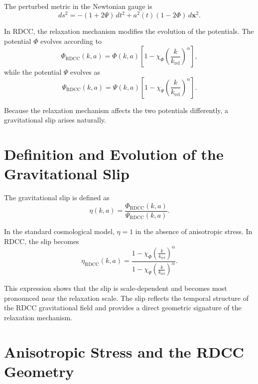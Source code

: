 \documentclass[11pt,a4paper]{article}
\begin{document}
The perturbed metric in the Newtonian gauge is
\begin{equation}
    ds^{2}
    = -(1 + 2\Psi)\,dt^{2}
      + a^{2}(t)(1 - 2\Phi)\,d\mathbf{x}^{2}.
\end{equation}

In RDCC, the relaxation mechanism modifies the evolution of the potentials. The 
potential $\Phi$ evolves according to
\begin{equation}
    \Phi_{\mathrm{RDCC}}(k,a)
    = \Phi(k,a)
      \left[
        1 - \chi_{\Phi}
        \left(\frac{k}{k_{\mathrm{rel}}}\right)^{\alpha}
      \right],
\end{equation}
while the potential $\Psi$ evolves as
\begin{equation}
    \Psi_{\mathrm{RDCC}}(k,a)
    = \Psi(k,a)
      \left[
        1 - \chi_{\Psi}
        \left(\frac{k}{k_{\mathrm{rel}}}\right)^{\alpha}
      \right].
\end{equation}

Because the relaxation mechanism affects the two potentials differently, a 
gravitational slip arises naturally.
\section{Definition and Evolution of the Gravitational Slip}

The gravitational slip is defined as
\begin{equation}
    \eta(k,a)
    = \frac{\Phi_{\mathrm{RDCC}}(k,a)}{\Psi_{\mathrm{RDCC}}(k,a)}.
\end{equation}

In the standard cosmological model, $\eta = 1$ in the absence of anisotropic 
stress. In RDCC, the slip becomes
\begin{equation}
    \eta_{\mathrm{RDCC}}(k,a)
    = \frac{
        1 - \chi_{\Phi}
        \left(\frac{k}{k_{\mathrm{rel}}}\right)^{\alpha}
    }{
        1 - \chi_{\Psi}
        \left(\frac{k}{k_{\mathrm{rel}}}\right)^{\alpha}
    }.
\end{equation}

This expression shows that the slip is scale-dependent and becomes most pronounced 
near the relaxation scale. The slip reflects the temporal structure of the RDCC 
gravitational field and provides a direct geometric signature of the relaxation 
mechanism.
\section{Anisotropic Stress and the RDCC Geometry}
\end{document}
